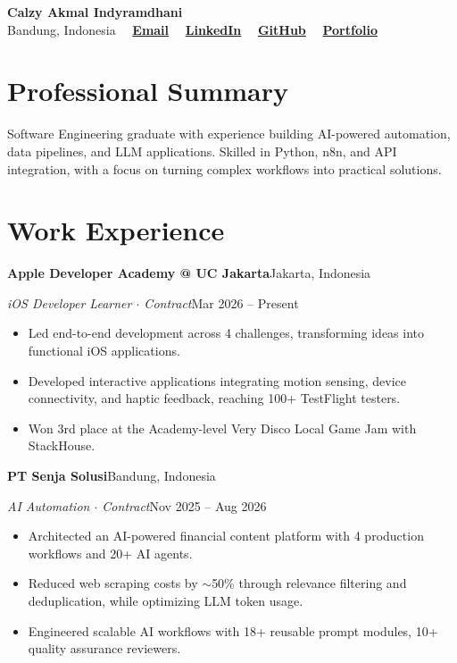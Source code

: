 \documentclass[10pt,a4paper]{article}
\newcommand{\entry}[4]{%
  \textbf{#1}\hfill #2\par
  \textit{#3}\hfill #4\par
}
\newcommand{\entrygap}{\vspace{4pt}}
\begin{document}
\begin{center}
  {\LARGE\bfseries Calzy Akmal Indyramdhani}\\[4pt]
  \small
  Bandung, Indonesia \ \textbar\
  \href{mailto:calzkmal@gmail.com}{\textbf{Email}} \ \textbar\
  \href{https://linkedin.com/in/calzkmal}{\textbf{LinkedIn}} \ \textbar\
  \href{https://github.com/calzkmal}{\textbf{GitHub}} \ \textbar\
  \href{https://caindyramdhani.vercel.app/}{\textbf{Portfolio}}
\end{center}

\section{Professional Summary}
Software Engineering graduate with experience building AI-powered automation, data pipelines, and LLM applications. Skilled in Python, n8n, and API integration, with a focus on turning complex workflows into practical solutions.

\section{Work Experience}

\entry{Apple Developer Academy @ UC Jakarta}{Jakarta, Indonesia}
      {iOS Developer Learner $\cdot$ Contract}{Mar 2026 -- Present}
\begin{itemize}
  \item Led end-to-end development across 4 challenges, transforming ideas into functional iOS applications.
  \item Developed interactive applications integrating motion sensing, device connectivity, and haptic feedback, reaching 100+ TestFlight testers.
  \item Won 3rd place at the Academy-level Very Disco Local Game Jam with StackHouse.
\end{itemize}
\entrygap

\entry{PT Senja Solusi}{Bandung, Indonesia}
      {AI Automation $\cdot$ Contract}{Nov 2025 -- Aug 2026}
\begin{itemize}
  \item Architected an AI-powered financial content platform with 4 production workflows and 20+ AI agents.
  \item Reduced web scraping costs by $\sim$50\% through relevance filtering and deduplication, while optimizing LLM token usage.
  \item Engineered scalable AI workflows with 18+ reusable prompt modules, 10+ quality assurance reviewers.
\end{itemize}
\entrygap
\end{document}
